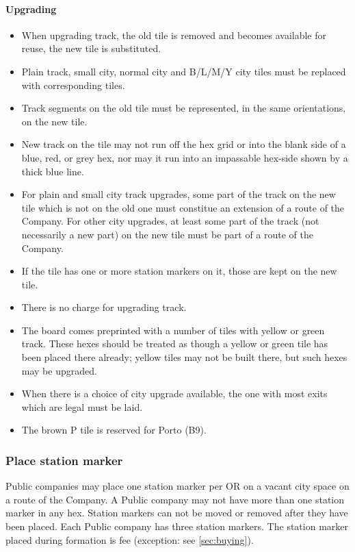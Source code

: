 \documentclass[a4paper,twocolumn]{article}
\begin{document}
\paragraph{Upgrading}
\begin{itemize}
	\item When upgrading track, the old tile is removed and becomes available
	for reuse, the new tile is substituted.
	\item Plain track, small city, normal city and B/L/M/Y city tiles must be
	replaced with corresponding tiles.
	\item Track segments on the old tile must be represented, in the same
	orientations, on the new tile.
	\item New track on the tile may not run off the hex grid or into the blank
	side of a blue, red, or grey hex, nor may it run into an impassable hex-side
	shown by a thick blue line.
	\item For plain and small city track upgrades, some part of the track on the
	new tile which is not on the old one must constitue an extension of a route
	of the Company. For other city upgrades, at least some part of the track
	(not necessarily a new part) on the new tile must be part of a route of the
	Company.
	\item If the tile has one or more station markers on it, those are kept on
	the new tile.
	\item There is no charge for upgrading track.
	\item The board comes preprinted with a number of tiles with yellow or green
	track. These hexes should be treated as though a yellow or green tile has
	been placed there already; yellow tiles may not be built there, but such
	hexes may be upgraded.
	\item When there is a choice of city upgrade available, the one with most
	exits which are legal must be laid.
	\item The brown P tile is reserved for Porto (B9).
\end{itemize}

\subsubsection{Place station marker}
Public companies may place one station marker per OR on a vacant city space on a
route of the Company. A Public company may not have more than one station marker
in any hex. Station markers can not be moved or removed after they have been
placed. Each Public company has three station markers. The station marker placed
during formation is fee (exception: see \autoref{sec:buying}).
\end{document}

